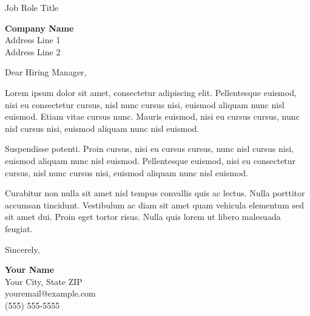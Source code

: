 \documentclass[10pt]{letter}
\begin{document}
\begin{letter}{}

\begin{tcolorbox}[colback=bannerblue, colframe=bannerblue, boxrule=0pt, arc=0pt,
    left=3pt, right=3pt, top=2pt, bottom=2pt, width=\textwidth, sharp corners]
    \color{bannertext}\sffamily\large Job Role Title
\end{tcolorbox}

\vspace{0.3em}
\begin{tcolorbox}[colback=white, colframe=bannerblue, boxrule=0.6pt, arc=2pt,
    left=4pt, right=4pt, top=1pt, bottom=1pt, width=\textwidth]
    \textbf{Company Name} \\ Address Line 1 \\ Address Line 2
\end{tcolorbox}

\vspace{0.8em}

\opening{\textcolor{bannerblue}{Dear Hiring Manager,}}

\vspace{0.5em}

Lorem ipsum dolor sit amet, consectetur adipiscing elit. Pellentesque euismod, nisi eu consectetur cursus, nisl nunc cursus nisi, euismod aliquam nunc nisl euismod. Etiam vitae cursus nunc. Mauris euismod, nisi eu cursus cursus, nunc nisl cursus nisi, euismod aliquam nunc nisl euismod.

\vspace{0.5em}
Suspendisse potenti. Proin cursus, nisi eu cursus cursus, nunc nisl cursus nisi, euismod aliquam nunc nisl euismod. Pellentesque euismod, nisi eu consectetur cursus, nisl nunc cursus nisi, euismod aliquam nunc nisl euismod.

\vspace{0.5em}
Curabitur non nulla sit amet nisl tempus convallis quis ac lectus. Nulla porttitor accumsan tincidunt. Vestibulum ac diam sit amet quam vehicula elementum sed sit amet dui. Proin eget tortor risus. Nulla quis lorem ut libero malesuada feugiat.

\vspace{0.6em}

\closing{\textcolor{bannerblue}{Sincerely,}}

\vspace{0.1em}

{\color{bannerblue}\textbf{Your Name} \\ Your City, State ZIP \\ youremail@example.com \\ (555) 555-5555}

\end{letter}
\end{document}
